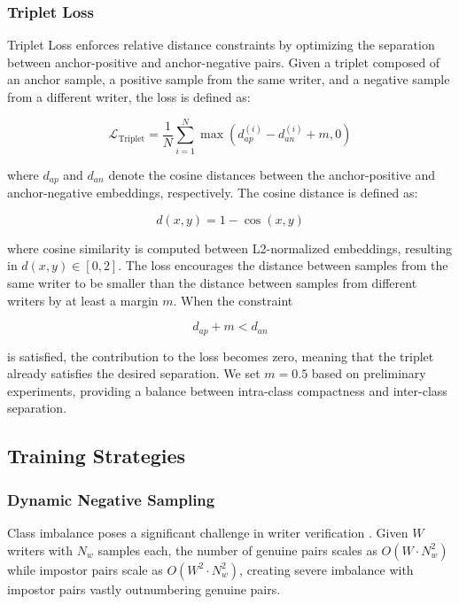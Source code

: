\subsubsection{Triplet Loss}

Triplet Loss enforces relative distance constraints by optimizing the separation between anchor-positive and anchor-negative pairs. Given a triplet composed of an anchor sample, a positive sample from the same writer, and a negative sample from a different writer, the loss is defined as:

\begin{equation}
\mathcal{L}_{\text{Triplet}} =
\frac{1}{N}\sum_{i=1}^{N}
\max\left(d_{ap}^{(i)} - d_{an}^{(i)} + m, 0\right)
\end{equation}

where $d_{ap}$ and $d_{an}$ denote the cosine distances between the anchor-positive and anchor-negative embeddings, respectively. The cosine distance is defined as:

\begin{equation}
d(x,y)=1-\cos(x,y)
\end{equation}

where cosine similarity is computed between L2-normalized embeddings, resulting in $d(x,y) \in [0,2]$. The loss encourages the distance between samples from the same writer to be smaller than the distance between samples from different writers by at least a margin $m$. When the constraint

\begin{equation}
d_{ap} + m < d_{an}
\end{equation}

is satisfied, the contribution to the loss becomes zero, meaning that the triplet already satisfies the desired separation. We set $m=0.5$ based on preliminary experiments, providing a balance between intra-class compactness and inter-class separation.

\subsection{Training Strategies}

\subsubsection{Dynamic Negative Sampling}

Class imbalance poses a significant challenge in writer verification \cite{he2009imbalanced}.
Given $W$ writers with $N_w$ samples each, the number of genuine pairs scales as
$O(W \cdot N_w^2)$ while impostor pairs scale as $O(W^2 \cdot N_w^2)$, creating severe
imbalance with impostor pairs vastly outnumbering genuine pairs.

